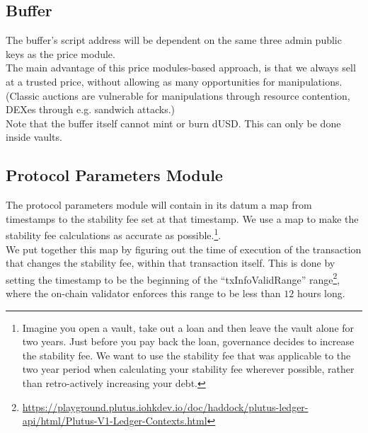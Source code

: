 \documentclass{article} %
\begin{document}


\subsection{Buffer}

The buffer's script address will be dependent on the same three admin public
keys as the price module. \\

The main advantage of this price modules-based approach, is that we always sell
at a trusted price, without allowing as many opportunities for manipulations.
(Classic auctions are vulnerable for manipulations through resource contention,
DEXes through e.g. sandwich attacks.) \\

Note that the buffer itself cannot mint or burn dUSD. This can only be done
inside vaults.

\subsection{Protocol Parameters Module}

The protocol parameters module will contain in its datum a map from timestamps
to the stability fee set at that timestamp.
We use a map to make the stability fee calculations as accurate as
possible.\footnote{
  Imagine you open a vault, take out a loan and then leave the vault alone for
  two years.
  Just before you pay back the loan, governance decides to increase the
  stability fee.
  We want to use the stability fee that was applicable to the two year period
  when calculating your stability fee wherever possible, rather than
  retro-actively increasing your debt.
}. \\

We put together this map by figuring out the time of execution of the
transaction that changes the stability fee, within that transaction itself.
This is done by setting the timestamp to be the beginning of the
``txInfoValidRange'' range\footnote{
  \url{https://playground.plutus.iohkdev.io/doc/haddock/plutus-ledger-api/html/Plutus-V1-Ledger-Contexts.html}},
where the on-chain validator enforces this range to be less than $12$ hours
long. \\
\end{document}
